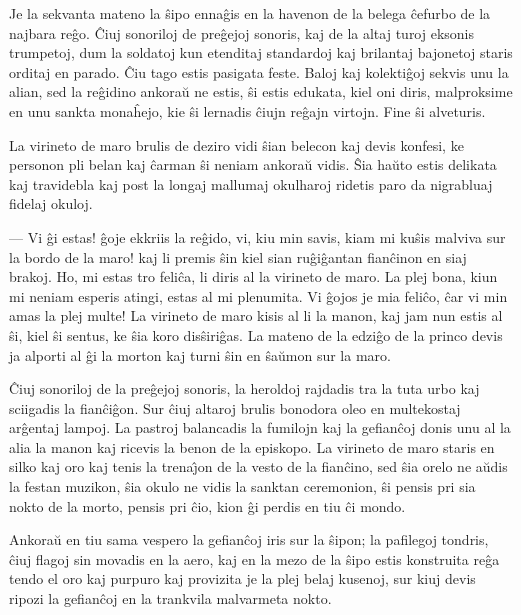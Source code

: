    Je la sekvanta mateno la \^sipo enna\^gis en la havenon de la belega
\^cefurbo de la najbara re\^go. \^Ciuj sonoriloj de pre\^gejoj
sonoris, kaj de la altaj turoj eksonis trumpetoj, dum la soldatoj
kun etenditaj standardoj kaj brilantaj bajonetoj staris orditaj en
parado. \^Ciu tago estis pasigata feste. Baloj kaj kolekti\^goj
sekvis unu la alian, sed la re\^gidino ankora\u u ne estis, \^si
estis edukata, kiel oni diris, malproksime en unu sankta mona\^hejo,
kie \^si lernadis \^ciujn re\^gajn virtojn. Fine \^si alveturis.

   La virineto de maro brulis de deziro vidi \^sian belecon kaj devis
konfesi, ke personon pli belan kaj \^carman \^si neniam ankora\u u
vidis. \^Sia ha\u uto estis delikata kaj travidebla kaj post la
longaj mallumaj okulharoj ridetis paro da nigrabluaj fidelaj okuloj.

 --- Vi \^gi estas! \^goje ekkriis la re\^gido, vi, kiu min savis, kiam
mi ku\^sis malviva sur la bordo de la maro! kaj li premis \^sin kiel
sian ru\^gi\^gantan fian\^cinon en siaj brakoj. Ho, mi estas tro
feli\^ca, li diris al la virineto de maro. La plej bona, kiun mi
neniam esperis atingi, estas al mi plenumita. Vi \^gojos je mia
feli\^co, \^car vi min amas la plej multe! La virineto de maro kisis
al li la manon, kaj jam nun estis al \^si, kiel \^si sentus, ke
\^sia koro dis\^siri\^gas. La mateno de la edzi\^go de la princo
devis ja alporti al \^gi la morton kaj turni \^sin en \^sa\u umon
sur la maro.

   \^Ciuj sonoriloj de la pre\^gejoj sonoris, la heroldoj rajdadis tra
la tuta urbo kaj sciigadis la fian\^ci\^gon. Sur \^ciuj altaroj
brulis bonodora oleo en multekostaj ar\^gentaj lampoj. La pastroj
balancadis la fumilojn kaj la gefian\^coj donis unu al la alia la
manon kaj ricevis la benon de la episkopo. La virineto de maro
staris en silko kaj oro kaj tenis la trena\^{\j}on de la vesto de la
fian\^cino, sed \^sia orelo ne a\u udis la festan muzikon, \^sia
okulo ne vidis la sanktan ceremonion, \^si pensis pri sia nokto de
la morto, pensis pri \^cio, kion \^gi perdis en tiu \^ci mondo.

   Ankora\u u en tiu sama vespero la gefian\^coj iris sur la \^sipon; la
pafilegoj tondris, \^ciuj flagoj sin movadis en la aero, kaj en la
mezo de la \^sipo estis konstruita re\^ga tendo el oro kaj purpuro
kaj provizita je la plej belaj kusenoj, sur kiuj devis ripozi la
gefian\^coj en la trankvila malvarmeta nokto.

